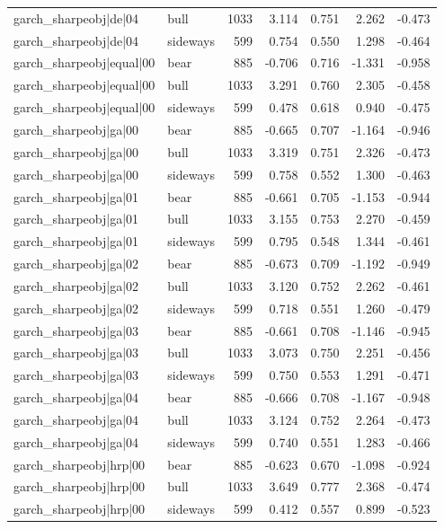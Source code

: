 \begin{table}
\begin{tabular}{llrrrrr}
garch\_sharpeobj|de|04 & bull & 1033 & 3.114 & 0.751 & 2.262 & -0.473 \\
garch\_sharpeobj|de|04 & sideways & 599 & 0.754 & 0.550 & 1.298 & -0.464 \\
garch\_sharpeobj|equal|00 & bear & 885 & -0.706 & 0.716 & -1.331 & -0.958 \\
garch\_sharpeobj|equal|00 & bull & 1033 & 3.291 & 0.760 & 2.305 & -0.458 \\
garch\_sharpeobj|equal|00 & sideways & 599 & 0.478 & 0.618 & 0.940 & -0.475 \\
garch\_sharpeobj|ga|00 & bear & 885 & -0.665 & 0.707 & -1.164 & -0.946 \\
garch\_sharpeobj|ga|00 & bull & 1033 & 3.319 & 0.751 & 2.326 & -0.473 \\
garch\_sharpeobj|ga|00 & sideways & 599 & 0.758 & 0.552 & 1.300 & -0.463 \\
garch\_sharpeobj|ga|01 & bear & 885 & -0.661 & 0.705 & -1.153 & -0.944 \\
garch\_sharpeobj|ga|01 & bull & 1033 & 3.155 & 0.753 & 2.270 & -0.459 \\
garch\_sharpeobj|ga|01 & sideways & 599 & 0.795 & 0.548 & 1.344 & -0.461 \\
garch\_sharpeobj|ga|02 & bear & 885 & -0.673 & 0.709 & -1.192 & -0.949 \\
garch\_sharpeobj|ga|02 & bull & 1033 & 3.120 & 0.752 & 2.262 & -0.461 \\
garch\_sharpeobj|ga|02 & sideways & 599 & 0.718 & 0.551 & 1.260 & -0.479 \\
garch\_sharpeobj|ga|03 & bear & 885 & -0.661 & 0.708 & -1.146 & -0.945 \\
garch\_sharpeobj|ga|03 & bull & 1033 & 3.073 & 0.750 & 2.251 & -0.456 \\
garch\_sharpeobj|ga|03 & sideways & 599 & 0.750 & 0.553 & 1.291 & -0.471 \\
garch\_sharpeobj|ga|04 & bear & 885 & -0.666 & 0.708 & -1.167 & -0.948 \\
garch\_sharpeobj|ga|04 & bull & 1033 & 3.124 & 0.752 & 2.264 & -0.473 \\
garch\_sharpeobj|ga|04 & sideways & 599 & 0.740 & 0.551 & 1.283 & -0.466 \\
garch\_sharpeobj|hrp|00 & bear & 885 & -0.623 & 0.670 & -1.098 & -0.924 \\
garch\_sharpeobj|hrp|00 & bull & 1033 & 3.649 & 0.777 & 2.368 & -0.474 \\
garch\_sharpeobj|hrp|00 & sideways & 599 & 0.412 & 0.557 & 0.899 & -0.523 \\

\end{tabular}
\end{table}
